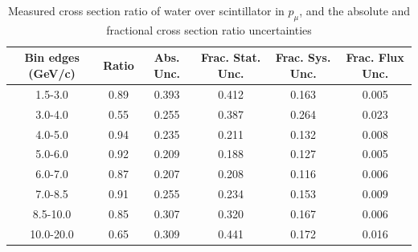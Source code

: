 \documentclass[../main.tex]{subfiles}
\begin{document}
\begin{table}
  \centering
  \renewcommand{\arraystretch}{1.15}
  \caption{Measured cross section ratio of water over scintillator in $p_{\mu}$, and the absolute and fractional cross section ratio uncertainties}
    \begin{tabular}{c||c|c||c|c|c}
      Bin edges (GeV/c) &  Ratio  &  Abs. Unc.  &  Frac. Stat. Unc.  &  Frac. Sys. Unc.  &  Frac. Flux Unc. \\
      \hline
      \hline
      1.5-3.0 & 0.89 & 0.393 & 0.412 & 0.163 & 0.005\\
      3.0-4.0 & 0.55 & 0.255 & 0.387 & 0.264 & 0.023\\
      4.0-5.0 & 0.94 & 0.235 & 0.211 & 0.132 & 0.008\\
      5.0-6.0 & 0.92 & 0.209 & 0.188 & 0.127 & 0.005\\
      6.0-7.0 & 0.87 & 0.207 & 0.208 & 0.116 & 0.006\\
      7.0-8.5 & 0.91 & 0.255 & 0.234 & 0.153 & 0.009\\
      8.5-10.0 & 0.85 & 0.307 & 0.320 & 0.167 & 0.006\\
      10.0-20.0 & 0.65 & 0.309 & 0.441 & 0.172 & 0.016
    \end{tabular}
  \label{tbl:rationucleonnuc10muon_pa}
\end{table}
\begin{table}
  \centering
  \renewcommand{\arraystretch}{1.15}
  \caption{Statistical covariance matrix of measured cross section ratio of water over scintillator in $p_{\mu}$}
  \label{tbl:rationucleonnuc10muon_pb}
\end{table}
\end{document}
